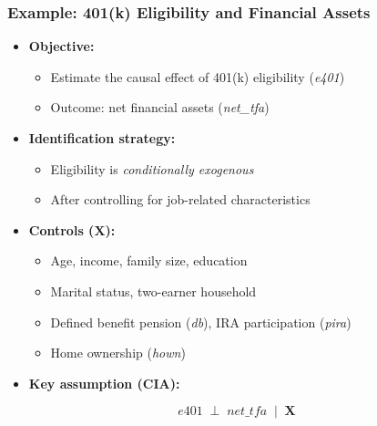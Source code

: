 \documentclass[12pt, compress]{beamer}
\begin{document}
\begin{frame}
	\frametitle{Example: 401(k) Eligibility and Financial Assets}

\begin{itemize}
	\item \textbf{Objective:}
	\begin{itemize}
		\item Estimate the causal effect of 401(k) eligibility (\textit{e401})
		\item Outcome: net financial assets (\textit{net\_tfa})
	\end{itemize}
	
	\medskip
	
	\item \textbf{Identification strategy:}
	\begin{itemize}
		\item Eligibility is \textit{conditionally exogenous}
		\item After controlling for job-related characteristics
	\end{itemize}
	
	\medskip
	
	\item \textbf{Controls ($\mathbf{X}$):}
	\begin{itemize}
		\item Age, income, family size, education
		\item Marital status, two-earner household
		\item Defined benefit pension (\textit{db}), IRA participation (\textit{pira})
		\item Home ownership (\textit{hown})
	\end{itemize}
	
	\medskip
	
	\item \textbf{Key assumption (CIA):}
\end{itemize}

\[
\textit{e401} \;\perp\; \textit{net\_tfa} \;\mid\; \mathbf{X}
\]

\end{frame}
\end{document}

